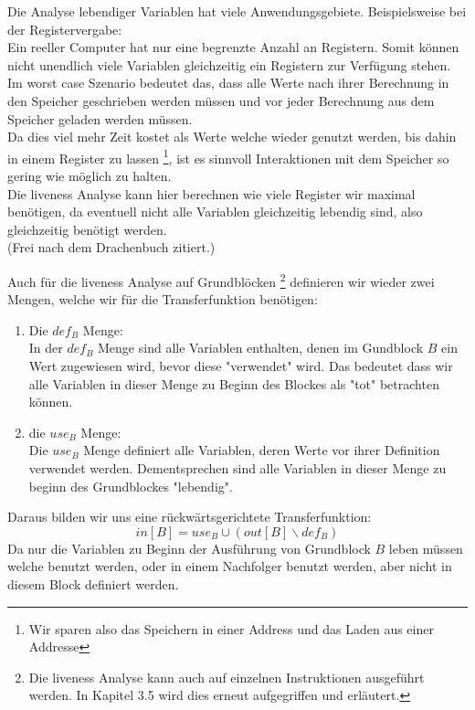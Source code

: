 Die Analyse lebendiger Variablen hat viele Anwendungsgebiete. 
Beispielsweise bei der Registervergabe:\\
Ein reeller Computer hat nur eine begrenzte Anzahl an Registern.
Somit können nicht unendlich viele Variablen gleichzeitig ein Registern zur Verfügung stehen.\\
Im worst case Szenario bedeutet das, dass alle Werte nach ihrer Berechnung
in den Speicher geschrieben werden müssen und vor jeder Berechnung aus dem
Speicher geladen werden müssen.\\
Da dies viel mehr Zeit kostet als Werte welche wieder genutzt werden,
bis dahin in einem Register zu lassen
\footnote{Wir sparen also das Speichern in einer Address und das Laden aus einer Addresse},
ist es sinnvoll Interaktionen mit dem Speicher so gering wie möglich zu halten.\\
Die liveness Analyse kann hier berechnen wie viele Register wir maximal benötigen,
da eventuell nicht alle Variablen gleichzeitig lebendig sind, also gleichzeitig benötigt werden.\\
(Frei nach dem Drachenbuch\cite[S.743-744]{D} zitiert.)

\newpage
Auch für die liveness Analyse auf Grundblöcken
\footnote{Die liveness Analyse kann auch auf einzelnen Instruktionen ausgeführt werden.
In Kapitel 3.5 wird dies erneut aufgegriffen und erläutert.}
definieren wir wieder zwei Mengen, welche wir
für die Transferfunktion benötigen\cite[S.743]{D}:

\begin{enumerate}
  \item Die $def_B$ Menge:\\
    In der $def_B$ Menge sind alle Variablen enthalten, denen im Gundblock $B$ ein Wert zugewiesen wird,
    bevor diese "verwendet" wird. Das bedeutet dass wir alle Variablen in dieser Menge zu Beginn des Blockes
    als "tot" betrachten können.
  \item die $use_B$ Menge:\\
    Die $use_B$ Menge definiert alle Variablen, deren Werte vor ihrer Definition verwendet werden.
    Dementsprechen sind alle Variablen in dieser Menge zu beginn des Grundblockes "lebendig".
\end{enumerate}

Daraus bilden wir uns eine rückwärtsgerichtete Transferfunktion:
\[in[B]=use_B\cup (out[B]\backslash def_B)\]
Da nur die Variablen zu Beginn der Ausführung von Grundblock $B$
leben müssen welche benutzt werden, oder in einem Nachfolger benutzt werden, 
aber nicht in diesem Block definiert werden.\\


